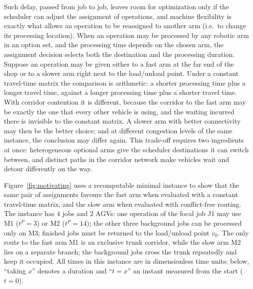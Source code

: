 \documentclass[manuscript,screen,review]{acmart}
\begin{document}
Such delay, passed from job to job, leaves room for optimization only if the scheduler can adjust the assignment of operations, and machine flexibility is exactly what allows an operation to be reassigned to another arm (i.e.\ to change its processing location).
When an operation may be processed by any robotic arm in an option set, and the processing time depends on the chosen arm, the assignment decision selects both the destination and the processing duration.
Suppose an operation may be given either to a fast arm at the far end of the shop or to a slower arm right next to the load/unload point.
Under a constant travel-time matrix the comparison is arithmetic: a shorter processing time plus a longer travel time, against a longer processing time plus a shorter travel time.
With corridor contention it is different, because the corridor to the fast arm may be exactly the one that every other vehicle is using, and the waiting incurred there is invisible to the constant matrix.
A slower arm with better connectivity may then be the better choice; and at different congestion levels of the same instance, the conclusion may differ again.
This trade-off requires two ingredients at once: heterogeneous optional arms give the scheduler destinations it can switch between, and distinct paths in the corridor network make vehicles wait and detour differently on the way.

Figure~\ref{fig:motivating} uses a recomputable minimal instance to show that the same pair of assignments favours the fast arm when evaluated with a constant travel-time matrix, and the slow arm when evaluated with conflict-free routing.
The instance has $4$ jobs and $2$ AGVs: one operation of the focal job J1 may use M1 ($t^P=3$) or M2 ($t^P=14$); the other three background jobs can be processed only on M3; finished jobs must be returned to the load/unload point $v_0$.
The only route to the fast arm M1 is an exclusive trunk corridor, while the slow arm M2 lies on a separate branch; the background jobs cross the trunk repeatedly and keep it occupied.
All times in this instance are in dimensionless time units: below, ``taking $x$'' denotes a duration and ``$t=x$'' an instant measured from the start ($t=0$).
\end{document}
